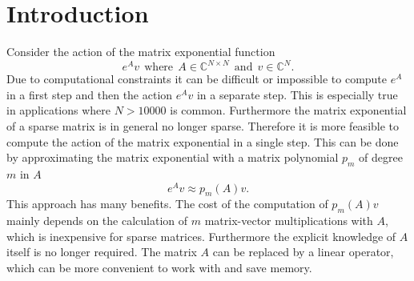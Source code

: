 \documentclass{scrartcl}
\begin{document}
\section{Introduction}
	Consider the action of the matrix exponential function 
	\[e^Av ~~\text{where}~~ A\in\mathbb{C}^{N\times N} ~~\text{and}~~ v\in\mathbb{C}^N.\] 
	Due to computational constraints it can be difficult or impossible to compute $e^A$ in a first step and then the action $e^Av$ in a separate step. This is especially true in applications where $N>10000$ is common. Furthermore the matrix exponential of a sparse matrix is in general no longer sparse. Therefore it is more feasible to compute the action of the matrix exponential in a single step. This can be done by approximating the matrix exponential with a matrix polynomial $p_m$ of degree $m$ in $A$
	\[e^Av \approx p_m(A)v.\]
	This approach has many benefits. The cost of the computation of $p_m(A)v$ mainly depends on the calculation of $m$ matrix-vector multiplications with $A$, which is inexpensive for sparse matrices. Furthermore the explicit knowledge of $A$ itself is no longer required. The matrix $A$ can be replaced by a linear operator, which can be more convenient to work with and save memory. 
	
\end{document}
